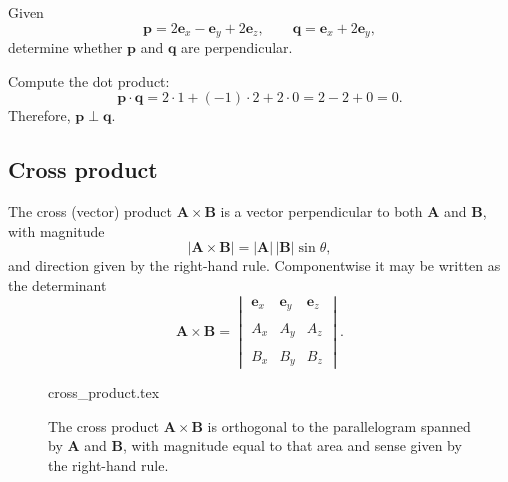 \begin{example}
Given
\begin{equation}
\mathbf{p}=2\mathbf{e}_x-\mathbf{e}_y+2\mathbf{e}_z,
\qquad
\mathbf{q}=\mathbf{e}_x+2\mathbf{e}_y,
\end{equation}
determine whether $\mathbf{p}$ and $\mathbf{q}$ are perpendicular.

Compute the dot product:
\begin{equation}
\mathbf{p}\cdot\mathbf{q}=2\cdot 1+(-1)\cdot 2+2\cdot 0=2-2+0=0.
\end{equation}
Therefore, $\mathbf{p}\perp\mathbf{q}$.
\end{example}

\subsection{Cross product}
The cross (vector) product $\mathbf{A}\times\mathbf{B}$ is a vector perpendicular to both $\mathbf{A}$ and $\mathbf{B}$, with magnitude
\begin{equation}
    |\mathbf{A}\times\mathbf{B}|=|\mathbf{A}|\,|\mathbf{B}|\sin\theta,
\end{equation}
and direction given by the right-hand rule. Componentwise it may be written as the determinant
\begin{equation}
    \mathbf{A}\times\mathbf{B}=\begin{vmatrix}\mathbf{e}_x & \mathbf{e}_y & \mathbf{e}_z \\\\ A_x & A_y & A_z \\\\ B_x & B_y & B_z \end{vmatrix}.
\end{equation}

\begin{figure}[htb]
    \centering
    {cross_product.tex}
    \caption{The cross product $\mathbf{A}\times\mathbf{B}$ is orthogonal to the parallelogram spanned by $\mathbf{A}$ and $\mathbf{B}$, with magnitude equal to that area and sense given by the right-hand rule.}
    \label{fig:vec_cross}
\end{figure}

